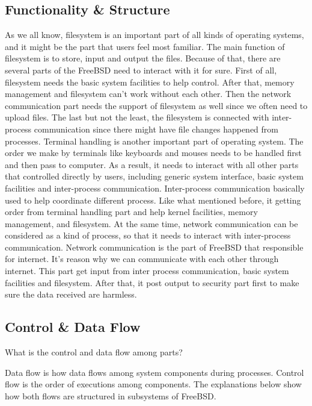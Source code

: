 \documentclass[12pt, dvipsnames, a4paper]{article}
\begin{document}
\subsection{Functionality \& Structure}
As we all know, filesystem is an important part of all kinds of operating systems, and it might be the part that users feel most familiar.  The main function of filesystem is to store, input and output the files.  Because of that, there are several parts of the FreeBSD need to interact with it for sure.  First of all, filesystem needs the basic system facilities to help control.  After that, memory management and filesystem can’t work without each other.  Then the network communication part needs the support of filesystem as well since we often need to upload files.  The last but not the least, the filesystem is connected with inter-process communication since there might have file changes happened from processes.
Terminal handling is another important part of operating system.  The order we make by terminals like keyboards and mouses needs to be handled first and then pass to computer.  As a result, it needs to interact with all other parts that controlled directly by users, including generic system interface, basic system facilities and inter-process communication.
Inter-process communication basically used to help coordinate different process.  Like what mentioned before, it getting order from terminal handling part and help kernel facilities, memory management, and filesystem.  At the same time, network communication can be considered as a kind of process, so that it needs to interact with inter-process communication.
Network communication is the part of FreeBSD that responsible for internet.  It’s reason why we can communicate with each other through internet.  This part get input from inter process communication, basic system facilities and filesystem.  After that, it post output to security part first to make sure the data received are harmless.

\subsection{Control \& Data Flow}
What is the control and data flow among parts?\par
Data flow is how data flows among system components during processes. Control flow is the order of executions among components. The explanations below show how both flows are structured in subsystems of FreeBSD.\par
\end{document}
